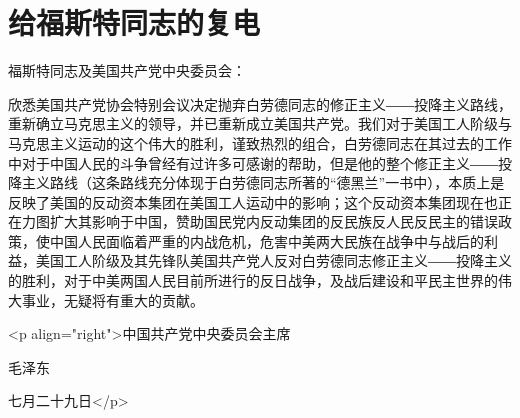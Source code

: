 \section[给福斯特同志的复电（一九四五年七月二十九日）]{给福斯特同志的复电}


福斯特同志及美国共产党中央委员会：

欣悉美国共产党协会特别会议决定抛弃白劳德同志的修正主义――投降主义路线，重新确立马克思主义的领导，并已重新成立美国共产党。我们对于美国工人阶级与马克思主义运动的这个伟大的胜利，谨致热烈的组合，白劳德同志在其过去的工作中对于中国人民的斗争曾经有过许多可感谢的帮助，但是他的整个修正主义――投降主义路线（这条路线充分体现于白劳德同志所著的“德黑兰”一书中），本质上是反映了美国的反动资本集团在美国工人运动中的影响；这个反动资本集团现在也正在力图扩大其影响于中国，赞助国民党内反动集团的反民族反人民反民主的错误政策，使中国人民面临着严重的内战危机，危害中美两大民族在战争中与战后的利益，美国工人阶级及其先锋队美国共产党人反对白劳德同志修正主义――投降主义的胜利，对于中美两国人民目前所进行的反日战争，及战后建设和平民主世界的伟大事业，无疑将有重大的贡献。

<p align="right">中国共产党中央委员会主席

毛泽东

七月二十九日</p>


